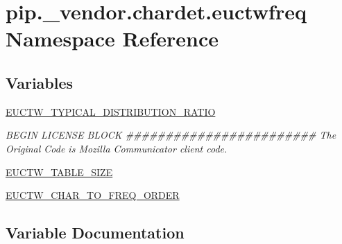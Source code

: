 \hypertarget{namespacepip_1_1__vendor_1_1chardet_1_1euctwfreq}{}\section{pip.\+\_\+vendor.\+chardet.\+euctwfreq Namespace Reference}
\label{namespacepip_1_1__vendor_1_1chardet_1_1euctwfreq}
\subsection*{Variables}
\begin{DoxyCompactItemize}
\item 
\hyperlink{namespacepip_1_1__vendor_1_1chardet_1_1euctwfreq_aaa5d9a8b15579ca596b20827e845115e}{E\+U\+C\+T\+W\+\_\+\+T\+Y\+P\+I\+C\+A\+L\+\_\+\+D\+I\+S\+T\+R\+I\+B\+U\+T\+I\+O\+N\+\_\+\+R\+A\+T\+IO}
\begin{DoxyCompactList}\small\item\em B\+E\+G\+IN L\+I\+C\+E\+N\+SE B\+L\+O\+CK \#\#\#\#\#\#\#\#\#\#\#\#\#\#\#\#\#\#\#\#\#\#\#\# The Original Code is Mozilla Communicator client code. \end{DoxyCompactList}\item 
\hyperlink{namespacepip_1_1__vendor_1_1chardet_1_1euctwfreq_ad291a895cb3793fc1718c212fc9ba819}{E\+U\+C\+T\+W\+\_\+\+T\+A\+B\+L\+E\+\_\+\+S\+I\+ZE}
\item 
\hyperlink{namespacepip_1_1__vendor_1_1chardet_1_1euctwfreq_a899b6e92a7d1ff7d018333ac91a84448}{E\+U\+C\+T\+W\+\_\+\+C\+H\+A\+R\+\_\+\+T\+O\+\_\+\+F\+R\+E\+Q\+\_\+\+O\+R\+D\+ER}
\end{DoxyCompactItemize}


\subsection{Variable Documentation}
\mbox{\label{namespacepip_1_1__vendor_1_1chardet_1_1euctwfreq_a899b6e92a7d1ff7d018333ac91a84448}} 
